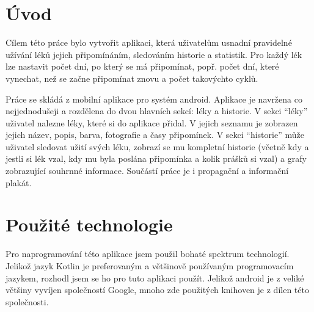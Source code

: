 \documentclass[a4paper,12pt]{report}
\begin{document}

\tableofcontents %

\chapter*{Úvod}

Cílem této práce bylo vytvořit aplikaci, která uživatelům usnadní pravidelné užívání léků jejich připomínáním, sledováním historie a statistik. Pro každý lék lze nastavit počet dní, po který se má připomínat, popř. počet dní, které vynechat, než se začne připomínat znovu a počet takovýchto cyklů.

Práce se skládá z mobilní aplikace pro systém android. Aplikace je navržena co nejjednodušeji a rozdělena do dvou hlavních sekcí: léky a historie. V sekci \enquote{léky} uživatel nalezne léky, které si do aplikace přidal. V jejich seznamu je zobrazen jejich název, popis, barva, fotografie a časy připomínek. V sekci \enquote{historie} může uživatel sledovat užití svých léku, zobrazí se mu kompletní historie (včetně kdy a jestli si lék vzal, kdy mu byla poslána připomínka a kolik prášků si vzal) a grafy zobrazující souhrnné informace. Součástí práce je i propagační a informační plakát. 


\chapter{Použité technologie}

Pro naprogramování této aplikace jsem použil bohaté spektrum technologií. Jelikož jazyk Kotlin je preferovaným a většinově používaným programovacím jazykem, rozhodl jsem se ho pro tuto aplikaci použít. Jelikož android je z veliké většiny vyvíjen společností Google, mnoho zde použitých knihoven je z dílen této společnosti.
\end{document}

